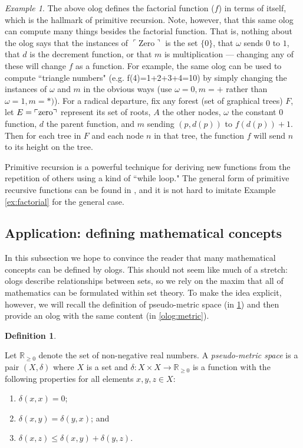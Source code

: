 \documentclass{amsart}
\def\to{\rightarrow}
\def\RR{{\mathbb R}}
\def\taking{\colon}
\def\cross{\times}
\newcommand{\fakebox}[1]{\tn{$\ulcorner$#1$\urcorner$}}
\theoremstyle{remark}
\newtheorem{example}[theorem]{Example}
\theoremstyle{definition}
\newtheorem{definition}[theorem]{Definition}
\def\tn{\textnormal}
\begin{document}
\begin{example}
The above olog defines the factorial function ($f$) in terms of itself, which is the hallmark of primitive recursion. Note, however, that this same olog can compute many things besides the factorial function. That is, nothing about the olog says that the instances of \fakebox{Zero} is the set $\{0\}$, that $\omega$ sends $0$ to $1$, that $d$ is the decrement function, or that $m$ is multiplication --- changing any of these will change $f$ as a function. For example, the same olog can be used to compute ``triangle numbers" (e.g. f(4)=1+2+3+4=10) by simply changing the instances of $\omega$ and $m$ in the obvious ways (use $\omega=0, m=+$ rather than $\omega=1,m=*)$). For a radical departure, fix any forest (set of graphical trees) $F$, let $E=\fakebox{zero}$ represent its set of roots, $A$ the other nodes, $\omega$ the constant 0 function, $d$ the parent function, and $m$ sending $(p,d(p))$ to $f(d(p))+1$. Then for each tree in $F$ and each node $n$ in that tree, the function $f$ will send $n$ to its height on the tree.

\end{example}

Primitive recursion is a powerful technique for deriving new functions from the repetition of others using a kind of ``while loop."  The general form of primitive recursive functions can be found in \cite{BBJ}, and it is not hard to imitate Example \ref{ex:factorial} for the general case.

\subsection{Application: defining mathematical concepts}\label{sec:app mathematics}

In this subsection we hope to convince the reader that many mathematical concepts can be defined by ologs. This should not seem like much of a stretch: ologs describe relationships between sets, so we rely on the maxim that all of mathematics can be formulated within set theory. To make the idea explicit, however, we will recall the definition of pseudo-metric space (in \ref{def:pseudo}) and then provide an olog with the same content (in \ref{olog:metric}).

\begin{definition}\label{def:pseudo}

Let $\RR_{\geq 0}$ denote the set of non-negative real numbers. A {\em pseudo-metric space} is a pair $(X,\delta)$ where $X$ is a set and $\delta\taking X\cross X\to\RR_{\geq 0}$ is a function with the following properties for all elements $x,y,z\in X$:\begin{enumerate}\item $\delta(x,x)=0$;\item $\delta(x,y)=\delta(y,x)$; and\item $\delta(x,z)\leq\delta(x,y)+\delta(y,z)$.\end{enumerate}

\end{definition}
\end{document}
